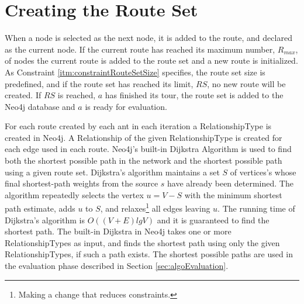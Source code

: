 \section{Creating the Route Set}
\label{sec:algoCreatingRouteSet}

When a node is selected as the next node, it is added to the route, and declared as the current node. If the current route has reached its maximum number, $R_{max}$, of nodes the current route is added to the route set and a new route is initialized. As Constraint \vref{itm:constraintRouteSetSize} specifies, the route set size is predefined, and if the route set has reached its limit, $RS$, no new route will be created. If $RS$ is reached, $a$ has finished its tour, the route set is added to the Neo4j database and $a$ is ready for evaluation. 

For each route created by each ant in each iteration a RelationshipType is created in Neo4j. A Relationship of the given RelationshipType is created for each edge used in each route. Neo4j's built-in Dijkstra Algorithm is used to find both the shortest possible path in the network and the shortest possible path using a given route set. Dijkstra's algorithm \cite[p.658-662]{cormen09} maintains a set $S$ of vertices's whose final shortest-path weights from the source $s$ have already been determined. The algorithm repeatedly selects the vertex $u = V - S$ with the minimum shortest path estimate, adds $u$ to $S$, and relaxes\footnote{Making a change that reduces constraints.} all edges leaving $u$. The running time of Dijkstra's algorithm is $O((V + E)lg V)$ and it is guaranteed to find the shortest path\cite[p.~661]{cormen09}. The built-in Dijkstra in Neo4j takes one or more RelationshipTypes as input, and finds the shortest path using only the given RelationshipTypes, if such a path exists. The shortest possible paths are used in the evaluation phase described in Section \vref{sec:algoEvaluation}.